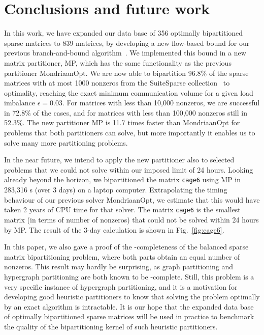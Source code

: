 \section{Conclusions and future work}
\label{sec:concl}
In this work, we have expanded our data base of 356 optimally bipartitioned sparse matrices
to 839 matrices, by developing a new flow-based bound for our previous branch-and-bound algorithm~\cite{pelt15}.
We implemented this bound in a new matrix partitioner, MP, which has the same functionality as the 
previous partitioner MondriaanOpt.
We are now able to bipartition 96.8\% of the sparse matrices with at most 1000 nonzeros
from the SuiteSparse collection~\cite{davis11}
to optimality, reaching the exact minimum communication volume for a given load imbalance $\epsilon=0.03$. 
For matrices with less than 10,000 nonzeros, we are successful in 72.8\% of the cases,
and for matrices with less than 100,000 nonzeros still in 52.3\%.    
The new partitioner MP is 11.7 times faster than MondriaanOpt for problems that both
partitioners can solve, but more importantly it enables us to solve many more partitioning problems.

In the near future, we intend to apply the new partitioner also to selected  problems that we could not solve
within our imposed limit of 24 hours. Looking already beyond the horizon,
we bipartitioned the matrix \texttt{cage6} using MP in 283,316 s (over 3 days) on a laptop computer.
Extrapolating the timing behaviour of our previous solver MondriaanOpt,
we estimate that this would have taken 2 years of CPU time for that solver.
The matrix \texttt{cage6} is the smallest matrix (in terms of number of nonzeros) that could not be solved within 24 hours
by MP.
The result of the 3-day calculation is shown in Fig.~\ref{fig:cage6}.

In this paper, we also gave a proof of the \NP-completeness of the balanced sparse matrix bipartitioning problem,
where both parts obtain an equal number of nonzeros. This result may hardly be surprising,
as graph partitioning and hypergraph partitioning are both known to be \NP-complete.
Still, this problem is a very specific instance of hypergraph partitioning,
and it is a motivation for developing good heuristic partitioners to know that solving the problem optimally
by an exact algorithm is intractable.
It is our hope that the expanded data base of optimally bipartitioned sparse matrices
will be used in practice to benchmark the quality of
the bipartitioning kernel of such heuristic partitioners.

